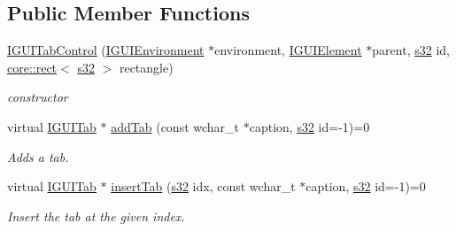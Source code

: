 \subsection*{Public Member Functions}
\begin{DoxyCompactItemize}
\item 
\mbox{\label{classirr_1_1gui_1_1IGUITabControl_a01e66ddc01de0a0185407e4bd839ed31}} 
\hyperlink{classirr_1_1gui_1_1IGUITabControl_a01e66ddc01de0a0185407e4bd839ed31}{I\+G\+U\+I\+Tab\+Control} (\hyperlink{classirr_1_1gui_1_1IGUIEnvironment}{I\+G\+U\+I\+Environment} $\ast$environment, \hyperlink{classirr_1_1gui_1_1IGUIElement}{I\+G\+U\+I\+Element} $\ast$parent, \hyperlink{namespaceirr_ac66849b7a6ed16e30ebede579f9b47c6}{s32} id, \hyperlink{classirr_1_1core_1_1rect}{core\+::rect}$<$ \hyperlink{namespaceirr_ac66849b7a6ed16e30ebede579f9b47c6}{s32} $>$ rectangle)
\begin{DoxyCompactList}\small\item\em constructor \end{DoxyCompactList}\item 
\mbox{\label{classirr_1_1gui_1_1IGUITabControl_a4b1a55fd79785abc4f5bcb05f8637a42}} 
virtual \hyperlink{classirr_1_1gui_1_1IGUITab}{I\+G\+U\+I\+Tab} $\ast$ \hyperlink{classirr_1_1gui_1_1IGUITabControl_a4b1a55fd79785abc4f5bcb05f8637a42}{add\+Tab} (const wchar\+\_\+t $\ast$caption, \hyperlink{namespaceirr_ac66849b7a6ed16e30ebede579f9b47c6}{s32} id=-\/1)=0
\begin{DoxyCompactList}\small\item\em Adds a tab. \end{DoxyCompactList}\item 
virtual \hyperlink{classirr_1_1gui_1_1IGUITab}{I\+G\+U\+I\+Tab} $\ast$ \hyperlink{classirr_1_1gui_1_1IGUITabControl_a7ee37817344a547a240b751e3386b85b}{insert\+Tab} (\hyperlink{namespaceirr_ac66849b7a6ed16e30ebede579f9b47c6}{s32} idx, const wchar\+\_\+t $\ast$caption, \hyperlink{namespaceirr_ac66849b7a6ed16e30ebede579f9b47c6}{s32} id=-\/1)=0
\begin{DoxyCompactList}\small\item\em Insert the tab at the given index. \end{DoxyCompactList}\item 
\mbox{\label{classirr_1_1gui_1_1IGUITabControl_a0d79c9d666527201b57e859e69b7523c}} 

\end{DoxyCompactItemize}
